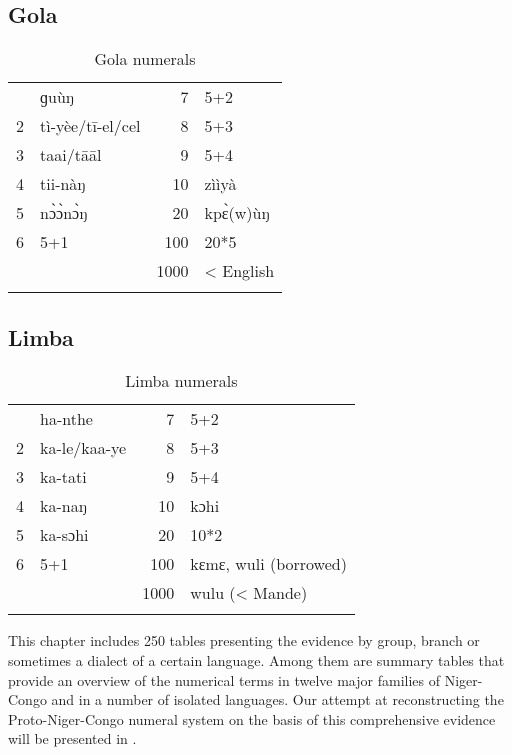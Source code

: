 \subsection{Gola}%
\begin{table}
\caption{\label{tab:3:249}Gola numerals}


\begin{tabularx}{.66\textwidth}{lQrl}
 & ɡuùŋ & 7 & 5+2\\
2 & tì-yèe/tī-el/cel & 8 & 5+3\\
3 & taai/tāāl & 9 & 5+4\\
4 & tii-nàŋ & 10 & zììyà\\
5 & n{\`{ɔ}}{\`{ɔ}}n{\`{ɔ}}ŋ & 20 & kp{\`{ɛ}}(w)ùŋ\\
6 & 5+1 & 100 & 20*5\\
&  & 1000 & < English\\
\lspbottomrule
\end{tabularx}
\end{table}

\largerpage[3] 
\subsection{Limba}%
\begin{table}[h]
\caption{\label{tab:3:250}Limba numerals}
\begin{tabularx}{.66\textwidth}{lQrl}
 & ha-nthe & 7 & 5+2\\
2 & ka-le/kaa-ye & 8 & 5+3\\
3 & ka-tati & 9 & 5+4\\
4 & ka-naŋ & 10 & kɔhi\\
5 & ka-sɔhi & 20 & 10*2\\
6 & 5+1 & 100 & kɛmɛ, wuli (borrowed)\\
&  & 1000 & wulu (< Mande)\\
\lspbottomrule
\end{tabularx}
\end{table}


This chapter includes 250 tables presenting the evidence by group, branch or sometimes a dialect of a certain language. Among them are summary tables that provide an overview of the numerical terms in twelve major families of Niger-Congo and in a number of isolated languages. Our attempt at reconstructing the Proto-Niger-Congo numeral system on the basis of this comprehensive evidence will be presented in .

